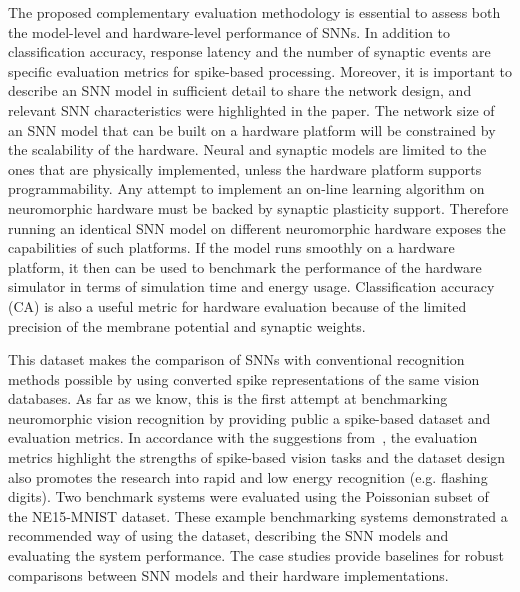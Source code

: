 The proposed complementary evaluation methodology is essential to assess both the model-level and hardware-level performance of SNNs.
In addition to classification accuracy, response latency and the number of synaptic events are specific evaluation metrics for spike-based processing.
Moreover, it is important to describe an SNN model in sufficient detail to share the network design, and relevant SNN characteristics were highlighted in the paper.  
The network size of an SNN model that can be built on a hardware platform will be constrained by the scalability of the hardware.
Neural and synaptic models are limited to the ones that are physically implemented, unless the hardware platform supports programmability.
Any attempt to implement an on-line learning algorithm on neuromorphic hardware must be backed by synaptic plasticity support.
Therefore running an identical SNN model on different neuromorphic hardware exposes the capabilities of such platforms.
If the model runs smoothly on a hardware platform, it then can be used to benchmark the performance of the hardware simulator in terms of simulation time and energy usage.
Classification accuracy (CA) is also a useful metric for hardware evaluation because of the limited precision of the membrane potential and synaptic weights.

This dataset makes the comparison of SNNs with conventional recognition methods possible by using converted spike representations of the same vision databases.
As far as we know, this is the first attempt at benchmarking neuromorphic vision recognition by providing public a spike-based dataset and evaluation metrics.
In accordance with the suggestions from~\cite{tan2015bench}, the evaluation metrics highlight the strengths of spike-based vision tasks and the dataset design also promotes the research into rapid and low energy recognition (e.g. flashing digits).
Two benchmark systems were evaluated using the Poissonian subset of the NE15-MNIST dataset.
These example benchmarking systems demonstrated a recommended way of using the dataset, describing the SNN models and evaluating the system performance.
The case studies provide baselines for robust comparisons between SNN models and their hardware implementations.

